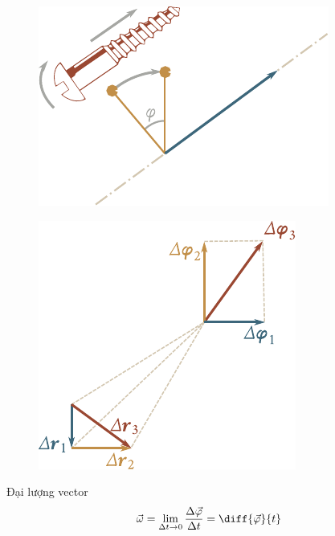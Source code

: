 \begin{figure}[!htb]
	\begin{minipage}[t]{0.5\linewidth}
		\begin{center}
			\includegraphics[scale=0.95]{figures/ch_01/fig_1_29.pdf}
			\caption[]{}
			\label{fig:1_29}
		\end{center}
	\end{minipage}
	\hfill{ }%
	\begin{minipage}[t]{0.5\linewidth}
		\begin{center}
			\includegraphics[scale=0.95]{figures/ch_01/fig_1_30.pdf}
			\caption[]{}
			\label{fig:1_30}
		\end{center}
	\end{minipage}
\end{figure}

Đại lượng vector
\begin{equation}\label{eq:1_93}
\vec{\omega} = \lim_{\Delta t\to 0} \frac{\Delta\vec{\varphi}}{\Delta t} = \diff{\vec{\varphi}}{t}
\end{equation}

